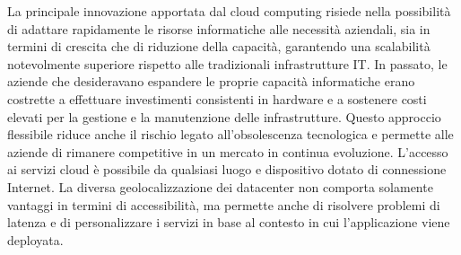 La principale innovazione apportata dal cloud computing risiede nella possibilità di adattare rapidamente le risorse informatiche alle necessità aziendali, sia in termini di crescita che di riduzione della capacità, garantendo una scalabilità notevolmente superiore rispetto alle tradizionali infrastrutture IT. In passato, le aziende che desideravano espandere le proprie capacità informatiche erano costrette a effettuare investimenti consistenti in hardware e a sostenere costi elevati per la gestione e la manutenzione delle infrastrutture. Questo approccio flessibile riduce anche il rischio legato all'obsolescenza tecnologica e permette alle aziende di rimanere competitive in un mercato in continua evoluzione. L’accesso ai servizi cloud è possibile da qualsiasi luogo e dispositivo dotato di connessione Internet. La diversa geolocalizzazione dei datacenter non comporta solamente vantaggi in termini di accessibilità, ma permette anche di risolvere problemi di latenza e di personalizzare i servizi in base al contesto in cui l'applicazione viene deployata. 



